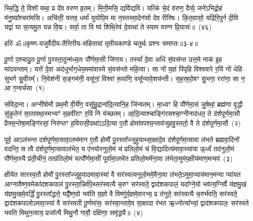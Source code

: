 च्चि॒द्धि ते॒ विशो॑ यथा॒ प्र दे॑व वरुण व्र॒तम्। मि॒नी॒मसि॒ द्यवि॑द्यवि। यत्किं चे॒दं व॑रुण॒ दैव्ये॒ जने॑\-ऽभिद्रो॒हं म॑नु॒ष्या᳚श्चरा॑मसि। अचि॑त्ती॒ यत्तव॒ धर्मा॑ युयोपि॒म मा न॒स्तस्मा॒देन॑सो देव रीरिषः। कि॒त॒वासो॒ यद्रि॑रि॒पुर्न दी॒वि यद्वा॑ घा स॒त्यमु॒त यन्न वि॒द्म। सर्वा॒ ता वि ष्य॑ शिथि॒रेव॑ दे॒वाथा॑ ते स्याम वरुण प्रि॒यासः॑॥~(४६)

{\anuvakamend[{सोमो॒ गोषु॒ मा र॒यिं मन्त्रो॒ यच्छि॑थि॒रा स॒प्त च॑}]}%

{हरिः॑ ॐ}{॥कृष्ण-यजुर्वेदीय-तैत्तिरीय-संहितायां तृतीयकाण्डे चतुर्थः प्रश्नः समाप्तः॥३-४॥}

\setcounter{anuvakam}{0}
पू॒र्णा प॒श्चादु॒त पू॒र्णा पु॒रस्ता॒दुन्म॑ध्य॒तः पौ᳚र्णमा॒सी जि॑गाय। तस्यां᳚ दे॒वा अधि॑ सं॒वस॑न्त उत्त॒मे नाक॑ इ॒ह मा॑दयन्ताम्। यत्ते॑ दे॒वा अद॑धुर्भाग॒धेय॒ममा॑वास्ये सं॒वस॑न्तो महि॒त्वा। सा नो॑ य॒ज्ञं पि॑पृहि विश्ववारे र॒यिं नो॑ धेहि सुभगे सु॒वीरम्᳚। नि॒वेश॑नी स॒ङ्गम॑नी॒ वसू॑नां॒ विश्वा॑ रू॒पाणि॒ वसू᳚न्यावे॒शय॑न्ती। स॒ह॒स्र॒पो॒षꣳ सु॒भगा॒ ररा॑णा॒ सा न॒ आ ग॒न्वर्च॑सा~(१)

संविदा॒ना। अग्नी॑षोमौ प्रथ॒मौ वी॒र्ये॑ण॒ वसू᳚न्रु॒द्राना॑दि॒त्यानि॒ह जि॑न्वतम्। मा॒ध्यꣳ हि पौ᳚र्णमा॒सं जु॒षेथां॒ ब्रह्म॑णा वृ॒द्धौ सु॑कृ॒तेन॑ सा॒तावथा॒स्मभ्यꣳ॑ स॒हवी॑राꣳ र॒यिं नि य॑च्छतम्। आ॒दि॒त्याश्चाङ्गि॑रसश्चा॒ग्नीनाद॑धत॒ ते द॑र्\mbox{}शपूर्णमा॒सौ प्रैफ्स॒न्तेषा॒\-मङ्गि॑रसां॒ निरु॑प्तꣳ ह॒विरासी॒दथा॑\-ऽऽ\-दि॒त्या ए॒तौ होमा॑वपश्य॒न्ता\-व॑जुहवु॒स्ततो॒ वै ते द॑र्\mbox{}शपूर्णमा॒सौ~(२)

पूर्व॒ आ\-ऽल॑भन्त दर्\mbox{}श\-पूर्ण\-मा॒सावा॒लभ॑मान ए॒तौ होमौ॑ पु॒रस्ता᳚ज्जुहुयाथ्सा॒क्षादे॒व द॑र्\mbox{}शपूर्णमा॒सावा ल॑भते ब्रह्मवा॒दिनो॑ वदन्ति॒ स त्वै द॑र्\mbox{}शपूर्णमा॒सावा\-ल॑भेत॒ य ए॑नयोरनुलो॒मं च॑ प्रतिलो॒मं च॑ वि॒द्यादित्य॑मावा॒स्या॑या ऊ॒र्ध्वं तद॑नुलो॒मं पौ᳚र्णमा॒स्यै प्र॑ती॒चीनं॒ तत्प्र॑तिलो॒मं यत्पौ᳚र्णमा॒सीं पूर्वा॑मा॒लभे॑त प्रतिलो॒ममे॑ना॒वा ल॑भेता॒मुम॑प॒क्षीय॑माण॒मन्वप॑~(३)

क्षीयेत सारस्व॒तौ होमौ॑ पु॒रस्ता᳚ज्जुहुयादमावा॒स्या॑ वै सर॑स्वत्यनुलो॒ममे॒वैना॒वा ल॑भते॒\-ऽमुमा॒प्याय॑मान॒मन्वा प्या॑यत आग्नावैष्ण॒वमेका॑\-दश\-कपालं पु॒रस्ता॒न्निर्व॑पे॒थ्सर॑स्वत्यै च॒रुꣳ सर॑स्वते॒ द्वाद॑श\-कपालं॒ यदा᳚ग्ने॒यो भव॑त्य॒ग्निर्वै य॑ज्ञमु॒खं य॑ज्ञमु॒खमे॒वर्द्धिं॑ पु॒रस्ता᳚द्धत्ते॒ यद्वै᳚ष्ण॒वो भव॑ति य॒ज्ञो वै विष्णु॑र्य॒ज्ञमे॒वारभ्य॒ प्र त॑नुते॒ सर॑स्वत्यै च॒रुर्भ॑वति॒ सर॑स्वते॒ द्वाद॑श\-कपालो\-ऽमावा॒स्या॑ वै सर॑स्वती पू॒र्णमा॑सः॒ सर॑स्वा॒न्तावे॒व सा॒क्षादा र॑भत ऋ॒ध्नोत्या᳚भ्यां॒ द्वाद॑श\-कपालः॒ सर॑स्वते भवति मिथुन॒त्वाय॒ प्रजा᳚त्यै मिथु॒नौ गावौ॒ दक्षि॑णा॒ समृ॑द्ध्यै॥~(४)

